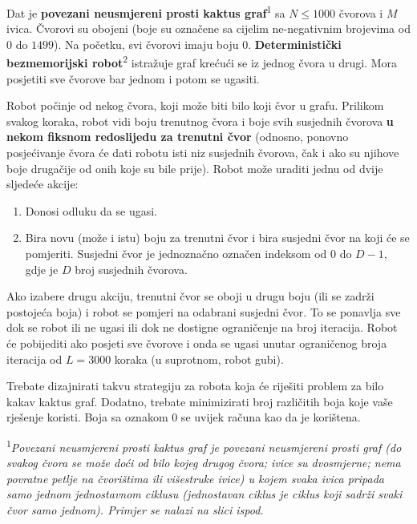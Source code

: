 \documentclass[12pt]{article}
\begin{document}
\renewcommand{\round}{Dan 2}
\renewcommand{\problemName}{Zadatak Navigacija}
\renewcommand{\lang}{Bosanski}

\renewcommand{\tl}{$3$ sek.}
\renewcommand{\ml}{$512$ MB}
\problem{\problemName}

Dat je \textbf{povezani neusmjereni prosti kaktus graf}\textsuperscript{1} sa $N \leq 1000$ čvorova i $M$ ivica.
Čvorovi su obojeni (boje su označene sa cijelim ne-negativnim brojevima od $0$ do $1499$). Na početku, svi čvorovi imaju boju $0$. \textbf{Deterministički bezmemorijski robot}\textsuperscript{2} istražuje graf krećući se iz jednog čvora u drugi. Mora posjetiti sve čvorove bar jednom i potom se ugasiti.

Robot počinje od nekog čvora, koji može biti bilo koji čvor u grafu. Prilikom svakog koraka, robot vidi boju trenutnog čvora i boje svih susjednih čvorova \textbf{u nekom fiksnom redoslijedu za trenutni čvor} (odnosno, ponovno posjećivanje čvora će dati robotu isti niz susjednih čvorova, čak i ako su njihove boje drugačije od onih koje su bile prije). Robot može uraditi jednu od dvije sljedeće akcije:
\begin{enumerate}
    \item Donosi odluku da se ugasi.
    \item Bira novu (može i istu) boju za trenutni čvor i bira susjedni čvor na koji će se pomjeriti. Susjedni čvor je jednoznačno označen indeksom od $0$ do $D-1$, gdje je $D$ broj susjednih čvorova.
\end{enumerate}

Ako izabere drugu akciju, trenutni čvor se oboji u drugu boju (ili se zadrži postojeća boja) i robot se pomjeri na odabrani susjedni čvor. To se ponavlja sve dok se robot ili ne ugasi ili dok ne dostigne ograničenje na broj iteracija. Robot će pobijediti ako posjeti sve čvorove i onda se ugasi unutar ograničenog broja iteracija od $L = 3000$ koraka (u suprotnom, robot gubi).

Trebate dizajnirati takvu strategiju za robota koja će riješiti problem za bilo kakav kaktus graf. Dodatno, trebate minimizirati broj različitih boja koje vaše rješenje koristi. Boja sa oznakom 0 se uvijek računa kao da je korištena.

\textsuperscript{1}\textit{Povezani neusmjereni prosti kaktus graf je povezani neusmjereni prosti graf (do svakog čvora se može doći od bilo kojeg drugog čvora; ivice su dvosmjerne; nema povratne petlje na čvorištima ili višestruke ivice) u kojem svaka ivica pripada samo jednom jednostavnom ciklusu (jednostavan ciklus je ciklus koji sadrži svaki čvor samo jednom). Primjer se nalazi na slici ispod.}
\end{document}
